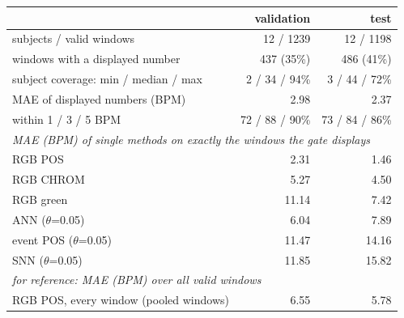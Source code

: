 \begin{tabular}{lrr}\toprule
& validation & test \\\midrule
subjects / valid windows & 12 / 1239 & 12 / 1198 \\
windows with a displayed number & 437 (35\%) & 486 (41\%) \\
subject coverage: min / median / max & 2 / 34 / 94\% & 3 / 44 / 72\% \\
MAE of displayed numbers (BPM) & 2.98 & 2.37 \\
within 1 / 3 / 5 BPM & 72 / 88 / 90\% & 73 / 84 / 86\% \\
\midrule \multicolumn{3}{l}{\emph{MAE (BPM) of single methods on exactly the windows the gate displays}} \\
RGB POS & 2.31 & 1.46 \\
RGB CHROM & 5.27 & 4.50 \\
RGB green & 11.14 & 7.42 \\
ANN ($\theta$=0.05) & 6.04 & 7.89 \\
event POS ($\theta$=0.05) & 11.47 & 14.16 \\
SNN ($\theta$=0.05) & 11.85 & 15.82 \\
\midrule \multicolumn{3}{l}{\emph{for reference: MAE (BPM) over all valid windows}} \\
RGB POS, every window (pooled windows) & 6.55 & 5.78 \\
\bottomrule\end{tabular}

